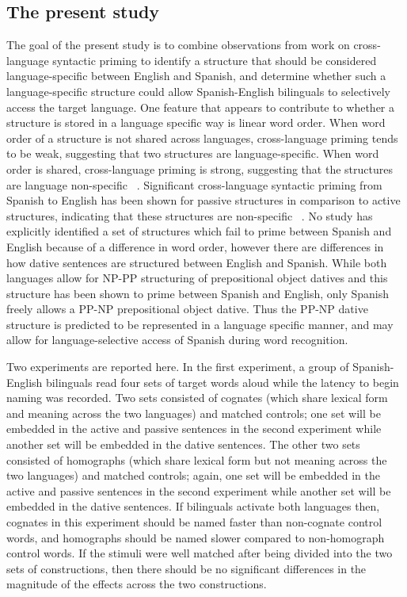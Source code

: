 \subsection{The present study}
\label{thepresentstudy}

The goal of the present study is to combine observations from work on cross-language syntactic priming to identify a structure that should be considered\\ language-specific between English and Spanish, and determine whether such a language-specific structure could allow Spanish-English bilinguals to selectively access the target language. One feature that appears to contribute to whether a structure is stored in a language specific way is linear word order. When word order of a structure is not shared across languages, cross-language priming tends to be weak, suggesting that two structures are language-specific. When word order is shared, cross-language priming is strong, suggesting that the structures are language non-specific ~\citep[e.g.,][]{Bernolet2007}. Significant cross-language syntactic priming from Spanish to English has been shown for passive structures in comparison to active structures, indicating that these structures are non-specific ~\citep{Hartsuiker2004}. No study has explicitly identified a set of structures which fail to prime between Spanish and English because of a difference in word order, however there are differences in how dative sentences are structured between English and Spanish. While both languages allow for NP-PP structuring of prepositional object datives and this structure has been shown to prime between Spanish and English, only Spanish freely allows a PP-NP prepositional object dative. Thus the PP-NP dative structure is predicted to be represented in a language specific manner, and may allow for language-selective access of Spanish during word recognition.

Two experiments are reported here. In the first experiment, a group of Spanish-English bilinguals read four sets of target words aloud while the latency to begin naming was recorded. Two sets consisted of cognates (which share lexical form and meaning across the two languages) and matched controls; one set will be embedded in the active and passive sentences in the second experiment while another set will be embedded in the dative sentences. The other two sets consisted of homographs (which share lexical form but not meaning across the two languages) and matched controls; again, one set will be embedded in the active and passive sentences in the second experiment while another set will be embedded in the dative sentences. If bilinguals activate both languages then, cognates in this experiment should be named faster than non-cognate control words, and homographs should be named slower compared to non-homograph control words. If the stimuli were well matched after being divided into the two sets of constructions, then there should be no significant differences in the magnitude of the effects across the two constructions. 

